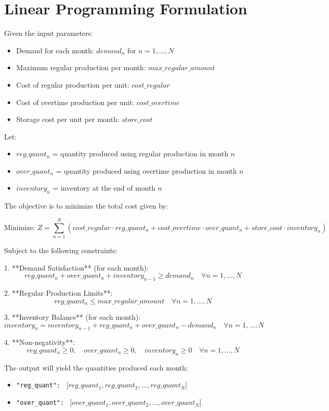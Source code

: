 \documentclass{article}
\begin{document}
\section*{Linear Programming Formulation}

Given the input parameters:

\begin{itemize}
    \item Demand for each month: \(demand_n\) for \(n = 1, \ldots, N\)
    \item Maximum regular production per month: \(max\_regular\_amount\)
    \item Cost of regular production per unit: \(cost\_regular\)
    \item Cost of overtime production per unit: \(cost\_overtime\)
    \item Storage cost per unit per month: \(store\_cost\)
\end{itemize}

Let:
\begin{itemize}
    \item \(reg\_quant_n\) = quantity produced using regular production in month \(n\)
    \item \(over\_quant_n\) = quantity produced using overtime production in month \(n\)
    \item \(inventory_n\) = inventory at the end of month \(n\)
\end{itemize}

The objective is to minimize the total cost given by:

\[
\text{Minimize: } Z = \sum_{n=1}^{N} \left( cost\_regular \cdot reg\_quant_n + cost\_overtime \cdot over\_quant_n + store\_cost \cdot inventory_n \right)
\]

Subject to the following constraints:

1. **Demand Satisfaction** (for each month):
\[
reg\_quant_n + over\_quant_n + inventory_{n-1} \geq demand_n \quad \forall n = 1, \ldots, N
\]

2. **Regular Production Limits**:
\[
reg\_quant_n \leq max\_regular\_amount \quad \forall n = 1, \ldots, N
\]

3. **Inventory Balance** (for each month):
\[
inventory_n = inventory_{n-1} + reg\_quant_n + over\_quant_n - demand_n \quad \forall n = 1, \ldots, N
\]

4. **Non-negativity**:
\[
reg\_quant_n \geq 0, \quad over\_quant_n \geq 0, \quad inventory_n \geq 0 \quad \forall n = 1, \ldots, N
\]

The output will yield the quantities produced each month:

\begin{itemize}
    \item \texttt{"reg\_quant": } [\(reg\_quant_1, reg\_quant_2, \ldots, reg\_quant_N\)]
    \item \texttt{"over\_quant": } [\(over\_quant_1, over\_quant_2, \ldots, over\_quant_N\)]
\end{itemize}
\end{document}
